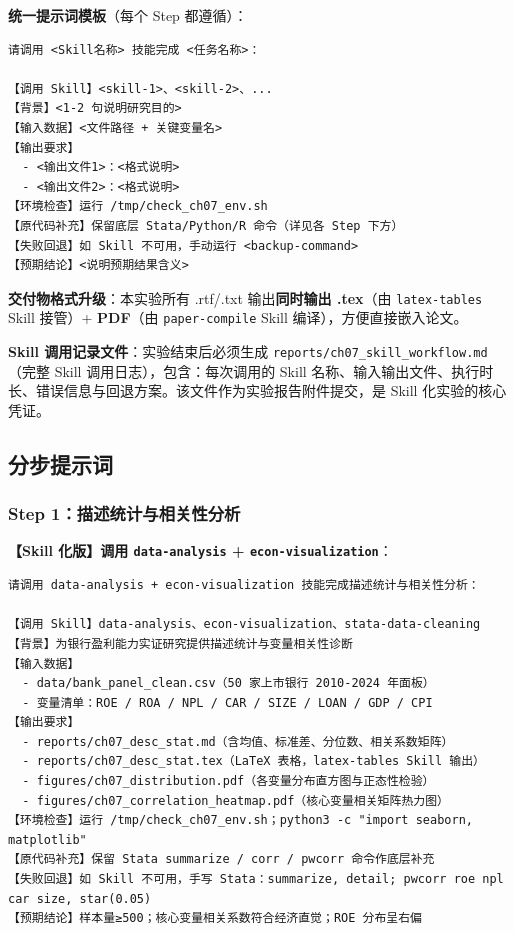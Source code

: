 \textbf{统一提示词模板}（每个 Step 都遵循）：

\begin{lstlisting}
请调用 <Skill名称> 技能完成 <任务名称>：

【调用 Skill】<skill-1>、<skill-2>、...
【背景】<1-2 句说明研究目的>
【输入数据】<文件路径 + 关键变量名>
【输出要求】
  - <输出文件1>：<格式说明>
  - <输出文件2>：<格式说明>
【环境检查】运行 /tmp/check_ch07_env.sh
【原代码补充】保留底层 Stata/Python/R 命令（详见各 Step 下方）
【失败回退】如 Skill 不可用，手动运行 <backup-command>
【预期结论】<说明预期结果含义>
\end{lstlisting}

\textbf{交付物格式升级}：本实验所有 .rtf/.txt 输出\textbf{同时输出 .tex}（由 \texttt{latex-tables} Skill 接管）+ \textbf{PDF}（由 \texttt{paper-compile} Skill 编译），方便直接嵌入论文。

\textbf{Skill 调用记录文件}：实验结束后必须生成 \texttt{reports/ch07\_skill\_workflow.md}（完整 Skill 调用日志），包含：每次调用的 Skill 名称、输入输出文件、执行时长、错误信息与回退方案。该文件作为实验报告附件提交，是 Skill 化实验的核心凭证。

\subsection{分步提示词}

\subsubsection{Step 1：描述统计与相关性分析}

\textbf{【Skill 化版】调用 \texttt{data-analysis} + \texttt{econ-visualization}}：

\begin{lstlisting}
请调用 data-analysis + econ-visualization 技能完成描述统计与相关性分析：

【调用 Skill】data-analysis、econ-visualization、stata-data-cleaning
【背景】为银行盈利能力实证研究提供描述统计与变量相关性诊断
【输入数据】
  - data/bank_panel_clean.csv（50 家上市银行 2010-2024 年面板）
  - 变量清单：ROE / ROA / NPL / CAR / SIZE / LOAN / GDP / CPI
【输出要求】
  - reports/ch07_desc_stat.md（含均值、标准差、分位数、相关系数矩阵）
  - reports/ch07_desc_stat.tex（LaTeX 表格，latex-tables Skill 输出）
  - figures/ch07_distribution.pdf（各变量分布直方图与正态性检验）
  - figures/ch07_correlation_heatmap.pdf（核心变量相关矩阵热力图）
【环境检查】运行 /tmp/check_ch07_env.sh；python3 -c "import seaborn, matplotlib"
【原代码补充】保留 Stata summarize / corr / pwcorr 命令作底层补充
【失败回退】如 Skill 不可用，手写 Stata：summarize, detail; pwcorr roe npl car size, star(0.05)
【预期结论】样本量≥500；核心变量相关系数符合经济直觉；ROE 分布呈右偏
\end{lstlisting}

